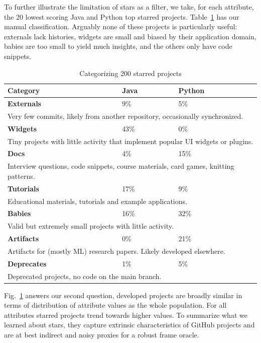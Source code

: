 \documentclass[sigconf,review,anonymous]{acmart}
\newcommand{\gh}{{GitHub}\xspace}
\begin{document}
To further illustrate the limitation of stars as a filter, we take, for each
attribute, the 20 lowest scoring Java and Python top starred projects.
Table~\ref{cat} has our manual classification. Arguably none of these projects
is particularly useful: externals lack histories, widgets are small and biased
by their application domain, babies are too small to yield much insights, and
the others only have code snippets.

\begin{table}[!h]\small
\begin{tabular}{|p{6cm}|l|l|}
 \hline
 Category & Java  &Python\\\hline
 {\bf Externals} &  9\% & 5\%\\\hline
 \multicolumn{3}{|p{8cm}|}{ \footnotesize Very few commits, likely
  from another repository, occasionally synchronized.}\\\hline
  {\bf Widgets} &  43\% & 0\%\\\hline
  \multicolumn{3}{|p{8cm}|}{ \footnotesize
  Tiny projects with little activity that implement popular UI widgets or plugins.}\\\hline
  {\bf Docs} &  4\% & 15\%\\\hline
  \multicolumn{3}{|p{8cm}|}{ \footnotesize
  Interview questions, code snippets, course materials, card games, knitting
  patterns.}\\\hline
  {\bf Tutorials} &  17\% & 9\%\\\hline
  \multicolumn{3}{|p{8cm}|}{ \footnotesize
  Educational materials, tutorials and example applications.}\\\hline
  {\bf Babies} &  16\% & 32\%\\\hline
  \multicolumn{3}{|p{8cm}|}{ \footnotesize
  Valid but extremely small projects with little activity.}\\\hline
  {\bf Artifacts} &  0\% & 21\%\\\hline
  \multicolumn{3}{|p{8cm}|}{ \footnotesize
  Artifacts for (mostly ML) research papers. Likely developed elsewhere.}\\\hline
  {\bf Deprecates} &  1\% & 5\%\\\hline
  \multicolumn{3}{|p{8cm}|}{ \footnotesize
  Deprecated projects, no code on the main branch.}\\\hline
\end{tabular}
\caption{Categorizing 200 starred projects}\label{cat}
\end{table}

Fig.~\ref{cat} answers our second question, developed projects are broadly
similar in terms of distribution of attribute values as the whole population.
For all attributes starred projects trend towards higher values. To summarize
what we learned about stars, they capture extrinsic characteristics of \gh
projects and are at best indirect and noisy proxies for a robust frame oracle.
\end{document}
